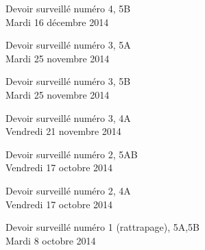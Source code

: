\documentclass[a4paper,10pt]{article}
\begin{document}
\begin{feuilleDS}{Devoir surveillé numéro 4, 5B\\ \small Mardi 16 décembre 2014}
\end{feuilleDS}


\begin{feuilleDS}{Devoir surveillé numéro 3, 5A\\ \small Mardi 25 novembre 2014}
\end{feuilleDS}

\begin{feuilleDS}{Devoir surveillé numéro 3, 5B\\ \small Mardi 25 novembre 2014}
\end{feuilleDS}

\begin{feuilleDS}{Devoir surveillé numéro 3, 4A\\ \small Vendredi 21 novembre 2014}
\end{feuilleDS}

\begin{feuilleDS}{Devoir surveillé numéro 2, 5AB\\ \small Vendredi 17 octobre 2014}  %
\end{feuilleDS}

\begin{feuilleDS}{Devoir surveillé numéro 2, 4A\\ \small Vendredi 17 octobre 2014}
\end{feuilleDS}


\begin{feuilleDS}{Devoir surveillé numéro 1 (rattrapage), 5A,5B\\ \small Mardi 8 octobre 2014}
\end{feuilleDS}
\end{document}
